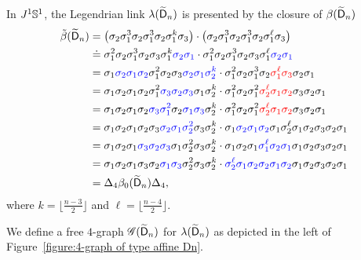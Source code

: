 In $J^1\mathbb{S}^1$, the Legendrian link $\lambda(\widetilde{\mathsf{D}}_n)$ is presented by the closure of $\beta(\widetilde{\mathsf{D}}_n)$
\begin{align*}
\tilde\beta(\widetilde{\mathsf{D}}_{n})&=\left(\sigma_2\sigma_1^3\sigma_2\sigma_1^3\sigma_2\sigma_1^k\sigma_3\right)
\cdot\left(\sigma_2\sigma_1^3\sigma_2\sigma_1^3\sigma_2\sigma_1^\ell\sigma_3\right)\\
&\mathrel{\dot{=}}\sigma_1^2\sigma_2\sigma_1^3\sigma_2\sigma_3\sigma_1^k{\color{blue}\sigma_2\sigma_1}\cdot
\sigma_1^2\sigma_2\sigma_1^3\sigma_2\sigma_3\sigma_1^\ell{\color{blue}\sigma_2\sigma_1}\\
&=\sigma_1{\color{blue}\sigma_2\sigma_1\sigma_2}\sigma_1^2\sigma_2\sigma_3{\color{blue}\sigma_2\sigma_1\sigma_2^k}\cdot
\sigma_1^2\sigma_2\sigma_1^3\sigma_2{\color{red}\sigma_1^\ell\sigma_3}\sigma_2\sigma_1\\
&=\sigma_1\sigma_2\sigma_1\sigma_2\sigma_1^2{\color{blue}\sigma_3\sigma_2\sigma_3}\sigma_1\sigma_2^k \cdot
\sigma_1^2\sigma_2\sigma_1^2{\color{red}\sigma_2^\ell\sigma_1\sigma_2}\sigma_3\sigma_2\sigma_1\\
&=\sigma_1\sigma_2\sigma_1\sigma_2{\color{blue}\sigma_3\sigma_1^2}\sigma_2{\color{blue}\sigma_1\sigma_3}\sigma_2^k \cdot
\sigma_1^2\sigma_2\sigma_1^2{\color{red}\sigma_2^\ell\sigma_1\sigma_2}\sigma_3\sigma_2\sigma_1\\
&=\sigma_1\sigma_2\sigma_1\sigma_2\sigma_3{\color{blue}\sigma_2\sigma_1\sigma_2^2}\sigma_3\sigma_2^k \cdot
\sigma_1{\color{blue}\sigma_2\sigma_1\sigma_2}\sigma_1\sigma_2^\ell\sigma_1\sigma_2\sigma_3\sigma_2\sigma_1\\
&=\sigma_1\sigma_2\sigma_1{\color{blue}\sigma_3\sigma_2\sigma_3}\sigma_1\sigma_2^2\sigma_3\sigma_2^k \cdot
\sigma_1\sigma_2\sigma_1{\color{blue}\sigma_1^\ell\sigma_2\sigma_1}\sigma_1\sigma_2\sigma_3\sigma_2\sigma_1\\
&=\sigma_1\sigma_2\sigma_1\sigma_3\sigma_2{\color{blue}\sigma_1\sigma_3}\sigma_2^2\sigma_3\sigma_2^k \cdot
{\color{blue}\sigma_2^\ell\sigma_1\sigma_2}{\color{blue}\sigma_2\sigma_1\sigma_2}\sigma_1\sigma_2\sigma_3\sigma_2\sigma_1\\
&=\Delta_4\beta_0(\widetilde{\mathsf{D}}_{n})\Delta_4,
\end{align*}
where $k=\lfloor \frac{n-3}2\rfloor$ and $\ell=\lfloor \frac{n-4}2\rfloor$.

\begin{definition}
We define a free $4$-graph $\mathscr{G}(\widetilde{\mathsf{D}}_{n})$ for $\lambda(\widetilde{\mathsf{D}}_n)$ as depicted in the left of Figure~\ref{figure:4-graph of type affine Dn}.
\end{definition}

